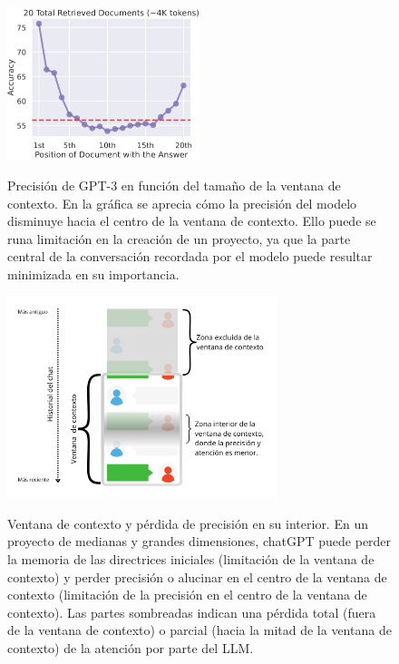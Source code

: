 \begin{figure}[H]
    \caption[Precisión de GPT-3 en función del tamaño de la ventana de contexto]{Precisión de GPT-3 en función del tamaño de la ventana de contexto. En la gráfica se aprecia cómo la precisión del modelo disminuye hacia el centro de la ventana de contexto. Ello puede se runa limitación en la creación de un proyecto, ya que la parte central de la conversación recordada por el modelo puede resultar minimizada en su importancia.}
    \centering
    \includegraphics[width=0.5\textwidth]{./figuras/Precision_LLM_gran_contexto.png}
    \label{fig:Precision_LLM_gran_contexto}
\end{figure}

\begin{figure}[H]
    \caption[Ventana de contexto y pérdida de precisión en su interior]{Ventana de contexto y pérdida de precisión en su interior. En un proyecto de medianas y grandes dimensiones, chatGPT puede perder la memoria de las directrices iniciales (limitación de la ventana de contexto) y perder precisión o alucinar en el centro de la ventana de contexto (limitación de la precisión en el centro de la ventana de contexto). Las partes sombreadas indican una pérdida total (fuera de la ventana de contexto) o parcial (hacia la mitad de la ventana de contexto) de la atención por parte del LLM.}
    \centering
    \includegraphics[width=0.7\textwidth]{./figuras/chat_ventana_lost_in_the_middle.png}
    \source{\propio}
    \label{fig:chat_ventana_lost_in_the_middle}
\end{figure}



